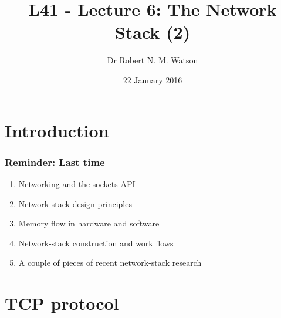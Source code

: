 
{
}

\usepackage[english]{babel}
\usepackage[latin1]{inputenc}
\usepackage{graphicx}
\usepackage{times}
\usepackage[T1]{fontenc}
\usepackage{fancyvrb}
\usepackage{listings}


\def\Tiny{\fontsize{4pt}{4pt} \selectfont}

\title{L41 - Lecture 6: The Network Stack (2)}
\author{Dr Robert N. M. Watson}
\date{22 January 2016}

\begin{frame}
  \titlepage
\end{frame}

\section{Introduction}

\begin{frame}
  \frametitle{Reminder: Last time}

  \begin{enumerate}
    \item Networking and the sockets API
    \item Network-stack design principles
    \item Memory flow in hardware and software
    \item Network-stack construction and work flows
    \item A couple of pieces of recent network-stack research
  \end{enumerate}
\end{frame}





\section{TCP protocol}

